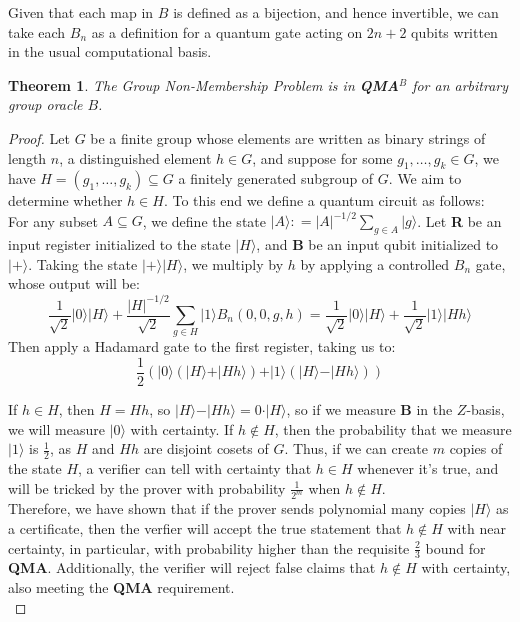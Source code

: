 \documentclass[12pt]{article}
\newtheorem*{thm}{Theorem}
\newcommand{\ket}[1]{\vert #1 \rangle}
\begin{document}
	Given that each map in $B$ is defined as a bijection, and hence invertible, we can take each $B_n$ as a definition for a quantum gate acting on $2n+2$ qubits written in the usual computational basis.
	\begin{thm}
		The Group Non-Membership Problem is in \textbf{QMA$^B$} for an arbitrary group oracle $B$.
	\end{thm}
	\begin{proof}
		Let $G$ be a finite group whose elements are written as binary strings of length $n$, a distinguished element $h\in G$, and suppose for some $g_1,\dots,g_k\in G$, we have $H=(g_1,\dots,g_k)\subseteq G$ a finitely generated subgroup of $G$. We aim to determine whether $h\in H$. To this end we define a quantum circuit as follows:\\
		
		 For any subset $A\subseteq G$, we define the state $\ket{A}\colon=|A|^{-1/2}\sum_{g\in A}\ket{g}$. Let \textbf{R} be an input register initialized to the state $\ket{H}$, and \textbf{B} be an input qubit initialized to $\ket{+}$. Taking the state $\ket{+}\ket{H}$, we multiply by $h$ by applying a controlled $B_n$ gate, whose output will be:
		 \[\frac{1}{\sqrt{2}}\ket{0}\ket{H}+\frac{|H|^{-1/2}}{\sqrt{2}}\sum_{g\in H}\ket{1}B_n(0,0,g,h)=\frac{1}{\sqrt{2}}\ket{0}\ket{H}+\frac{1}{\sqrt{2}}\ket{1}\ket{Hh}\]
		 Then apply a Hadamard gate to the first register, taking us to:
		 \[\frac{1}{2}(\ket{0}(\ket{H}+\ket{Hh})+\ket{1}(\ket{H}-\ket{Hh}))\]
		
		If $h\in H$, then $H=Hh$, so $\ket{H}-\ket{Hh}=0\cdot\ket{H}$, so if we measure \textbf{B} in the $Z$-basis, we will measure $\ket{0}$ with certainty. If $h\notin H$, then the probability that we measure $\ket{1}$ is $\frac{1}{2}$, as $H$ and $Hh$ are disjoint cosets of $G$. Thus, if we can create $m$ copies of the state $H$, a verifier can tell with certainty that $h\in H$ whenever it's true, and will be tricked by the prover with probability $\frac{1}{2^m}$ when $h\notin H$.\\
		
		Therefore, we have shown that if the prover sends polynomial many copies $\ket{H}$ as a certificate, then the verfier will accept the true statement that $h\notin H$ with near certainty, in particular, with probability higher than the requisite $\frac{2}{3}$ bound for \textbf{QMA}. Additionally, the verifier will reject false claims that $h\notin H$ with certainty, also meeting the \textbf{QMA} requirement. \\
		

\end{proof}
\end{document}
